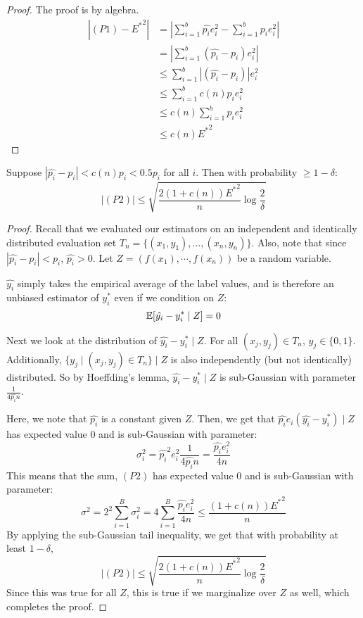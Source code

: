 \begin{proof}
The proof is by algebra. 
\begin{align*}
|(P1) - {E^*}^2| &= | \sum_{i=1}^b \hat{p_i}e_i^2 - \sum_{i=1}^b p_i e_i^2 | \\
&= | \sum_{i=1}^b (\hat{p_i} - p_i) e_i^2 | \\
&\leq \sum_{i=1}^b |(\hat{p_i} - p_i)| e_i^2 \\
&\leq \sum_{i=1}^b c(n) p_i e_i^2 \\
&\leq c(n) \sum_{i=1}^b p_i e_i^2 \\
&\leq c(n) {E^*}^2
\end{align*}
\end{proof}

\begin{lemma}[P2]
\label{lem:p2_bound}
Suppose $|\hat{p_i} - p_i| < c(n)p_i < 0.5p_i$ for all $i$. Then with probability $\geq 1 - \delta$:
\[ |(P2)| \leq \sqrt{\frac{2(1+c(n)){E^*}^2}{n} \log{\frac{2}{\delta}}} \]
\end{lemma}

\begin{proof}
Recall that we evaluated our estimators on an independent and identically distributed evaluation set $T_n = \{(x_1, y_1), \dots, (x_n, y_n)\}$. Also, note that since $|\hat{p_i} - p_i| < p_i$, $\hat{p_i} > 0$. Let $Z = (f(x_1), \cdots, f(x_n))$ be a random variable. 

$\hat{y_i}$ simply takes the empirical average of the label values, and is therefore an unbiased estimator of $y_i^*$ even if we condition on $Z$:
\[ \mathbb{E}[\hat{y_i} - y_i^* \mid Z] = 0 \]

Next we look at the distribution of $\hat{y_i} - y_i^* \mid Z$. For all $(x_j, y_j) \in T_n$, $y_j \in \{0, 1\}$. Additionally, $\{y_j \mid (x_j, y_j) \in T_n\} \mid Z$ is also independently (but not identically) distributed. So by Hoeffding's lemma, $\hat{y_i} - y_i^* \mid Z$ is sub-Gaussian with parameter $\frac{1}{4 \hat{p_i} n}$.

Here, we note that $\hat{p_i}$ is a constant given $Z$.
Then, we get that $\hat{p_i}e_i(\hat{y_i} - y_i^*) \mid Z$ has expected value $0$ and is sub-Gaussian with parameter:
\[ \sigma_i^2 = \hat{p_i}^2 e_i^2 \frac{1}{4 \hat{p_i} n} = \frac{\hat{p_i} e_i^2}{4n} \]
This means that the sum, $(P2)$ has expected value $0$ and is sub-Gaussian with  parameter:
\[ \sigma^2 = 2^2 \sum_{i=1}^B \sigma_i^2 = 4 \sum_{i=1}^B \frac{\hat{p_i} e_i^2}{4n} \leq \frac{(1+c(n)){E^*}^2}{n} \]
By applying the sub-Gaussian tail inequality, we get that with probability at least $1-\delta$,
\[ |(P2)| \leq \sqrt{\frac{2(1+c(n)){E^*}^2}{n} \log{\frac{2}{\delta}}} \]
Since this was true for all $Z$, this is true if we marginalize over $Z$ as well, which completes the proof.
\end{proof}

